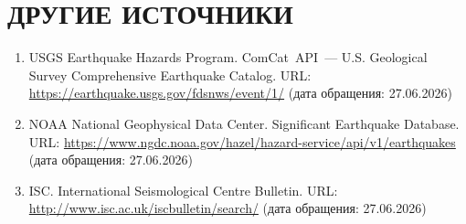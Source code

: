\documentclass[12pt,a4paper]{article}
\begin{document}
\vspace{0.6cm}

\section*{ДРУГИЕ ИСТОЧНИКИ}

\begin{enumerate}[leftmargin=*,label=\arabic*.]

\item USGS Earthquake Hazards Program. ComCat~API~---
U.S. Geological Survey Comprehensive Earthquake Catalog.
URL: \url{https://earthquake.usgs.gov/fdsnws/event/1/}
(дата обращения: 27.06.2026)

\item NOAA National Geophysical Data Center. Significant Earthquake Database.
URL: \url{https://www.ngdc.noaa.gov/hazel/hazard-service/api/v1/earthquakes}
(дата обращения: 27.06.2026)

\item ISC. International Seismological Centre Bulletin.
URL: \url{http://www.isc.ac.uk/iscbulletin/search/}
(дата обращения: 27.06.2026)

\end{enumerate}
\end{document}
